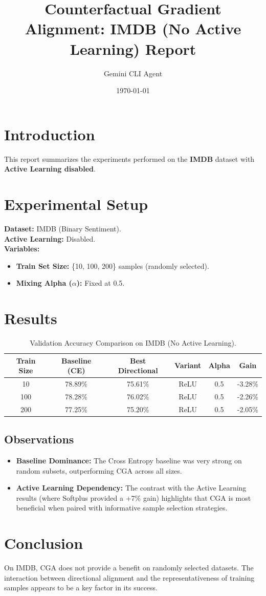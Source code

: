 \documentclass{article}
\title{Counterfactual Gradient Alignment: IMDB (No Active Learning) Report}
\author{Gemini CLI Agent}
\date{\today}
\begin{document}
\maketitle

\section{Introduction}
This report summarizes the experiments performed on the \textbf{IMDB} dataset with \textbf{Active Learning disabled}.

\section{Experimental Setup}
\textbf{Dataset:} IMDB (Binary Sentiment). \\
\textbf{Active Learning:} Disabled. \\
\textbf{Variables:}
\begin{itemize}
    \item \textbf{Train Set Size:} \{10, 100, 200\} samples (randomly selected).
    \item \textbf{Mixing Alpha (\(\alpha\)):} Fixed at 0.5.
\end{itemize}

\section{Results}

\begin{table}[h]
\centering
\begin{tabular}{@{}cccccc@{}}
\toprule
\textbf{Train Size} & \textbf{Baseline (CE)} & \textbf{Best Directional} & \textbf{Variant} & \textbf{Alpha} & \textbf{Gain} \\
\midrule
10 & 78.89\% & 75.61\% & ReLU & 0.5 & -3.28\% \\
100 & 78.28\% & 76.02\% & ReLU & 0.5 & -2.26\% \\
200 & 77.25\% & 75.20\% & ReLU & 0.5 & -2.05\% \\
\bottomrule
\end{tabular}
\caption{Validation Accuracy Comparison on IMDB (No Active Learning).}
\label{tab:results}
\end{table}

\subsection{Observations}
\begin{itemize}
    \item \textbf{Baseline Dominance:} The Cross Entropy baseline was very strong on random subsets, outperforming CGA across all sizes.
    \item \textbf{Active Learning Dependency:} The contrast with the Active Learning results (where Softplus provided a +7\% gain) highlights that CGA is most beneficial when paired with informative sample selection strategies.
\end{itemize}

\section{Conclusion}
On IMDB, CGA does not provide a benefit on randomly selected datasets. The interaction between directional alignment and the representativeness of training samples appears to be a key factor in its success.
\end{document}
